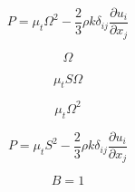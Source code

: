 

\begin{equation}
P = \mu_t \Omega^2 - \frac{2}{3}\rho k \delta_{ij} \frac{\partial u_i}{\partial x_j}
\end{equation}

\begin{equation}
\Omega
\end{equation}

\begin{equation}
\mu_t S \Omega
\end{equation}

\begin{equation}
\mu_t \Omega^2
\end{equation}

\begin{equation}
P = \mu_t S^2 - \frac{2}{3}\rho k \delta_{ij} \frac{\partial u_i}{\partial x_j}
\end{equation}

\begin{equation}
B=1
\end{equation}


